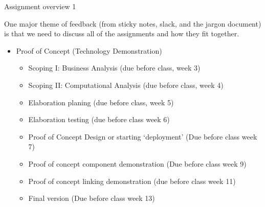 \documentclass[aspectratio=1610, 11pt]{beamer} %
\begin{document}
\begin{frame}{Assignment overview 1}

One major theme of feedback (from sticky notes, slack, and the jargon document) is that we need to discuss all of the assignments and how they fit together.

\begin{itemize}[label=\textbullet]
\item Proof of Concept (Technology Demonstration)
\begin{itemize}[label=\textbullet]
\item Scoping I: Business Analysis (due before class, week 3)
\item Scoping II: Computational Analysis (due before class, week 4)
\item Elaboration planing (due before class, week 5)
\item Elaboration testing (due before class week 6)
\item Proof of Concept Design or starting `deployment' (Due before class week 7)
\item Proof of concept component demonstration (Due before class week 9)
\item Proof of concept linking demonstration (due before class week 11)
\item Final version (Due before class week 13)
\end{itemize}
\end{itemize}
\end{frame}
\end{document}
